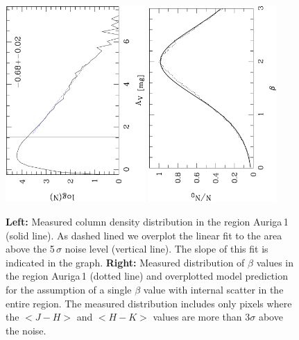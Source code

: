 \documentclass[useAMS,usenatbib]{mn2e}
\begin{document}
\begin{appendix}
\begin{figure}
\includegraphics[height=7.5cm,angle=-90]{av_dist_aurigae1.ps}
\hfill
\includegraphics[height=7.5cm,angle=-90]{histo_aurigae1.ps}
\caption{\label{plots_aurigae1} {\bf Left:} Measured column density distribution
in the region Auriga\,1 (solid line). As dashed lined we overplot the linear fit
to the area above the 5\,$\sigma$ noise level (vertical line). The slope of this
fit is indicated in the graph. {\bf Right:} Measured distribution of $\beta$
values in the region Auriga\,1 (dotted line) and overplotted model prediction
for the assumption of a single $\beta$ value with internal scatter in the entire
region. The measured distribution includes only pixels where the $<J-H>$ and
$<H-K>$ values are more than 3$\sigma$ above the noise.} 
\end{figure}


\end{appendix}
\end{document}
